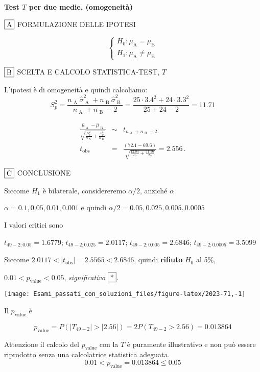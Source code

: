 \documentclass[
  11pt,
]{book}
\theoremstyle{mytheoremstyle}
\theoremstyle{mydefstyle}
\newenvironment{sol}
  {
  \begin{tcolorbox}[enhanced,breakable,arc=0.1mm,boxrule=1pt,colback=white,colframe=iblue,
  title=\bf \fontfamily{lmss}\selectfont \hspace{.5 cm} Soluzione,drop fuzzy shadow]

}{
\end{tcolorbox}
  }
\begin{document}
\begin{sol}
\textbf{Test \(T\) per due medie, (omogeneità)}

\(\fbox{A}\) FORMULAZIONE DELLE IPOTESI

\[\begin{cases}
   H_0: \mu_\text{A} = \mu_\text{B} \\
   H_1: \mu_\text{A} \neq \mu_\text{B} 
   \end{cases}\]

\(\fbox{B}\) SCELTA E CALCOLO STATISTICA-TEST, \(T\)

L'ipotesi è di omogeneità e quindi calcoliamo:\[
   S_p^2=\frac{n_\text{ A }\hat\sigma^2_\text{ A }+n_\text{ B }\hat\sigma^2_\text{ B }}{n_\text{ A }+n_\text{ B }-2} =
   \frac{ 25 \cdot 3.4 ^2+ 24 \cdot 3.3 ^2}{ 25 + 24 -2}= 11.71 
  \]

\begin{eqnarray*}
  \frac{\hat\mu_\text{ A } - \hat\mu_\text{ B }}
  {\sqrt{\frac {S^2_p}{n_\text{ A }}+\frac {S^2_p}{n_\text{ B }}}}&\sim&t_{n_\text{ A }+n_\text{ B }-2}\\
  t_{\text{obs}}
  &=& \frac{ ( 72.1 -  69.6 )} {\sqrt{\frac{ 12.04 }{ 25 }+\frac{ 11.36 }{ 24 }}}
  =   2.556 \, .
  \end{eqnarray*}

\(\fbox{C}\) CONCLUSIONE

Siccome \(H_1\) è bilaterale, considereremo \(\alpha/2\),
anziché \(\alpha\)

\(\alpha=0.1, 0.05, 0.01, 0.001\) e quindi \(\alpha/2=0.05, 0.025, 0.005, 0.0005\)

I valori critici sono

\(t_{49-2;0.05}=1.6779\); \(t_{49-2;0.025}=2.0117\); \(t_{49-2;0.005}=2.6846\); \(t_{49-2;0.0005}=3.5099\)

Siccome \(2.0117<|t_\text{obs}|=2.5565<2.6846\), quindi \textbf{rifiuto} \(H_0\) al 5\%,

\(0.01<p_\text{value}<0.05\), \emph{significativo} \(\fbox{*}\).

\begin{center}\texttt{[image: Esami\_passati\_con\_soluzioni\_files/figure-latex/2023-71,-1]} \end{center}

Il \(p_{\text{value}}\) è

\[ p_{\text{value}} = P(|T_{49-2}|>|2.56|)=2P(T_{49-2}>2.56)=0.013864 \]

Attenzione il calcolo del \(p_\text{value}\) con la \(T\) è puramente illustrativo e non può essere riprodotto senza una calcolatrice statistica adeguata.\[
 0.01 < p_\text{value}= 0.013864 \leq 0.05 
\]

\end{sol}
\end{document}
